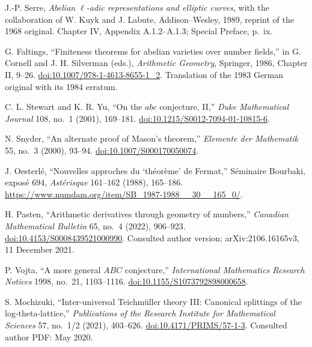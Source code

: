 
J.-P. Serre,
\emph{Abelian $\ell$-adic representations and elliptic curves},
with the collaboration of W. Kuyk and J. Labute,
Addison--Wesley, 1989, reprint of the 1968 original.
Chapter IV, Appendix A.1.2--A.1.3; Special Preface, p.~ix.

G. Faltings,
``Finiteness theorems for abelian varieties over number fields,''
in G. Cornell and J. H. Silverman (eds.), \emph{Arithmetic Geometry},
Springer, 1986, Chapter II, 9--26.
\href{https://doi.org/10.1007/978-1-4613-8655-1_2}{doi:10.1007/978-1-4613-8655-1\_2}.
Translation of the 1983 German original with its 1984 erratum.

C. L. Stewart and K. R. Yu,
``On the $abc$ conjecture, II,''
\emph{Duke Mathematical Journal} 108, no.~1 (2001), 169--181.
\href{https://doi.org/10.1215/S0012-7094-01-10815-6}{doi:10.1215/S0012-7094-01-10815-6}.

N. Snyder,
``An alternate proof of Mason's theorem,''
\emph{Elemente der Mathematik} 55, no.~3 (2000), 93--94.
\href{https://doi.org/10.1007/S000170050074}{doi:10.1007/S000170050074}.

J. Oesterl\'e,
``Nouvelles approches du `th\'eor\`eme' de Fermat,''
S\'eminaire Bourbaki, expos\'e 694,
\emph{Ast\'erisque} 161--162 (1988), 165--186.
\url{https://www.numdam.org/item/SB_1987-1988__30__165_0/}.

H. Pasten,
``Arithmetic derivatives through geometry of numbers,''
\emph{Canadian Mathematical Bulletin} 65, no.~4 (2022), 906--923.
\href{https://doi.org/10.4153/S0008439521000990}{doi:10.4153/S0008439521000990}.
Consulted author version: arXiv:2106.16165v3, 11 December 2021.

P. Vojta,
``A more general $ABC$ conjecture,''
\emph{International Mathematics Research Notices} 1998, no.~21, 1103--1116.
\href{https://doi.org/10.1155/S1073792898000658}{doi:10.1155/S1073792898000658}.

S. Mochizuki,
``Inter-universal Teichm\"uller theory III: Canonical splittings of the log-theta-lattice,''
\emph{Publications of the Research Institute for Mathematical Sciences}
57, no.~1/2 (2021), 403--626.
\href{https://doi.org/10.4171/PRIMS/57-1-3}{doi:10.4171/PRIMS/57-1-3}.
Consulted author PDF: May 2020.

